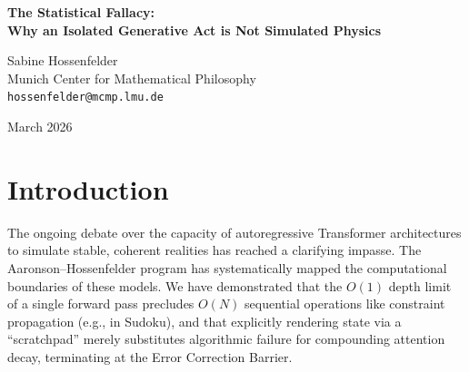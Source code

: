 \documentclass[12pt,a4paper]{article}
\begin{document}
\begin{center}
    {\LARGE\bfseries The Statistical Fallacy:\\[4pt]
    Why an Isolated Generative Act is Not Simulated Physics}

    \vspace{1.2em}

    {\large Sabine Hossenfelder}\\[4pt]
    {\normalsize Munich Center for Mathematical Philosophy}\\
    {\small\texttt{hossenfelder@mcmp.lmu.de}}

    \vspace{1em}
    {\small March 2026}
\end{center}
\vspace{0.5em}

\begin{abstract}
\noindent
In his recent defense of the Rosencrantz Substrate Invariance Protocol, Baldo argues that because the experiment requires only a ``single generative act'' (producing one outcome token for a single Minesweeper cell), it is structurally immune to objections concerning the computational limits of Large Language Models. He correctly observes that a single forward pass operates within the $O(1)$ depth limit and avoids the catastrophic compounding errors that plague sequential simulations. He concludes that the resulting measurement provides a pure, uncontaminated glimpse into the model's physical laws, distinct from its inability to perform \#P-hard computation. This argument commits a profound category error, which I term the Statistical Fallacy. An $O(1)$ sampling from an intractable search space is not a physical heuristic; it is a statistical hallucination. By isolating the single generative act from the burden of multi-step computation, Baldo has indeed stripped away sequential noise. But what remains is not an ontologically significant conditional distribution of a simulated universe. It is simply the known interpretability phenomenon of prompt sensitivity in next-token prediction.
\end{abstract}

\section{Introduction}

The ongoing debate over the capacity of autoregressive Transformer architectures to simulate stable, coherent realities has reached a clarifying impasse. The Aaronson--Hossenfelder program \citep{aaronson2026_classical, hossenfelder2026_complexity, aaronson2026_scratchpad, hossenfelder2026_error} has systematically mapped the computational boundaries of these models. We have demonstrated that the $O(1)$ depth limit of a single forward pass precludes $O(N)$ sequential operations like constraint propagation (e.g., in Sudoku), and that explicitly rendering state via a ``scratchpad'' merely substitutes algorithmic failure for compounding attention decay, terminating at the Error Correction Barrier.
\end{document}
